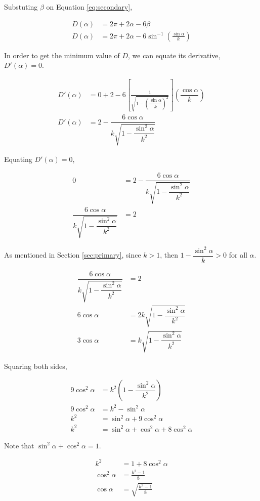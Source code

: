 \documentclass[a4paper,12pt]{article}
\begin{document}
Substuting $\beta$ on Equation \eqref{eq:secondary},

\begin{align}
D(\alpha) &= 2\pi + 2\alpha - 6\beta \nonumber\\
D(\alpha) &= 2\pi + 2\alpha - 6 \sin^{-1} \left( \frac{\sin \alpha}{k} \right)
\end{align}

In order to get the minimum value of $D$, we can equate its derivative, $D'(\alpha) = 0$.

\begin{align}
D'(\alpha) &= 0 + 2 - 6 \left[ \frac{1}{\sqrt{1- \left( \dfrac{\sin \alpha}{k}\right)^2}}\right]\left(\dfrac{\cos \alpha}{k}\right) \nonumber\\
D'(\alpha) &= 2 - \dfrac{6\cos \alpha}{k\sqrt{1-\dfrac{\sin^2 \alpha}{k^2}}} \label{eq:derivativesec}
\end{align}

Equating $D'(\alpha) = 0$,

\begin{align}
0 &= 2 - \dfrac{6\cos \alpha}{k\sqrt{1-\dfrac{\sin^2 \alpha}{k^2}}}\nonumber\\
\dfrac{6\cos \alpha}{k\sqrt{1-\dfrac{\sin^2 \alpha}{k^2}}} &= 2
\end{align}

As mentioned in Section \ref{sec:primary}, since $k>1$, then $1-\dfrac{\sin^2 \alpha}{k} >0$ for all $\alpha$.

\begin{align}
\dfrac{6\cos \alpha}{k\sqrt{1-\dfrac{\sin^2 \alpha}{k^2}}} &= 2\nonumber\\
6\cos \alpha &= 2k\sqrt{1-\dfrac{\sin^2 \alpha}{k^2}}\nonumber\\
3\cos \alpha &= k\sqrt{1-\dfrac{\sin^2 \alpha}{k^2}}
\end{align}

Squaring both sides,

\begin{align}
9\cos^2 \alpha &= k^2\left( 1- \dfrac{\sin^2\alpha}{k^2}\right) \nonumber\\
9\cos^2 \alpha &= k^2 - \sin^2 \alpha \nonumber\\
k^2 &= \sin^2 \alpha +9 \cos^2 \alpha \nonumber\\
k^2 &= \sin^2 \alpha + \cos^2 \alpha + 8\cos^2 \alpha
\end{align}

Note that $\sin^2 \alpha + \cos^2 \alpha = 1$.

\begin{align}
k^2 &= 1 + 8\cos^2 \alpha \nonumber\\
\cos^2 \alpha &= \frac{k^2-1}{8} \nonumber\\
\cos \alpha &= \sqrt{\frac{k^2-1}{8}} \nonumber
\end{align}
\end{document}
